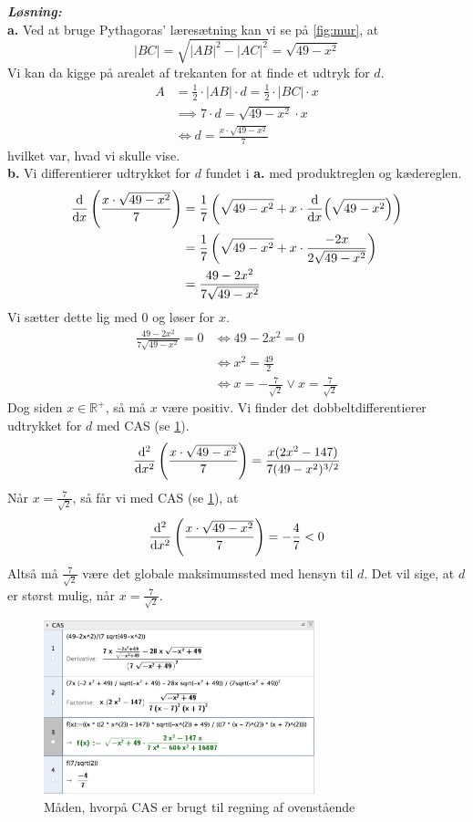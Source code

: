 \documentclass{article}
\newcommand{\sol}{\setlength{\parindent}{0cm}\textbf{\textit{Løsning:}}\setlength{\parindent}{1cm}}
\begin{document}
\sol \\ 
\textbf{a.} Ved at bruge Pythagoras' læresætning kan vi se på \cref{fig:mur}, at
\[
\left|BC\right|=\sqrt{\left|AB\right|^2-\left|AC\right|^2} = \sqrt{49-x^2} 
\] 
Vi kan da kigge på arealet af trekanten for at finde et udtryk for $d$.
\begin{equation*}
\begin{split}
  A&=\frac{1}{2}\cdot \left|AB\right| \cdot d = \frac{1}{2} \cdot \left|BC\right| \cdot x\\
  &\implies 7 \cdot d = \sqrt{49-x^2} \cdot x\\ 
  &\iff d=\frac{x\cdot \sqrt{49-x^2} }{7}
\end{split}
\end{equation*}
hvilket var, hvad vi skulle vise. \\[1ex]
\textbf{b.} Vi differentierer udtrykket for $d$ fundet i \textbf{a.} med produktreglen og kædereglen.
\begin{equation*}
\begin{split}
  \dv{x} \left(\frac{x\cdot \sqrt{49-x^2} }{7}\right)&=\frac{1}{7} \left(\sqrt{49-x^2} + x\cdot \dv{x} (\sqrt{49-x^2} )\right) \\ 
  &= \frac{1}{7} \left(\sqrt{49-x^2} + x\cdot \frac{-2x}{2 \sqrt{49-x^2} } \right)\\ 
  &= \frac{49-2x^2}{7 \sqrt{49-x^2} }
\end{split}
\end{equation*}
Vi sætter dette lig med 0 og løser for $x$.
\begin{equation*}
\begin{split}
  \frac{49-2x^2}{7 \sqrt{49-x^2} }= 0 &\iff 49 - 2x^2=0 \\ 
  &\iff x^2=\frac{49}{2}\\ 
  &\iff x=-\frac{7}{\sqrt{2} } \lor x=\frac{7}{\sqrt{2} }
\end{split}
\end{equation*}
Dog siden $x \in \mathbb{R}^+$, så må $x$ være positiv. 
Vi finder det dobbeltdifferentierer udtrykket for $d$ med CAS (se \cref{fig:CAS}). 
\[
\dv[2]{x}\left(\frac{x\cdot \sqrt{49-x^2} }{7}\right)=\frac{x(2x^2-147)}{7(49-x^2)^{3/2}}
\] 
Når $x=\frac{7}{\sqrt{2} }$, så får vi med CAS (se \cref{fig:CAS}), at
\[
\dv[2]{x}\left(\frac{x\cdot \sqrt{49-x^2} }{7}\right)=-\frac{4}{7}<0
\] 
Altså må $\frac{7}{\sqrt{2} }$ være det globale maksimumssted med hensyn til $d$. 
Det vil sige, at $d$ er størst mulig, når $x=\frac{7}{\sqrt{2} }$. 
\begin{figure}[H]
\begin{center}
  \includegraphics[width=0.7\textwidth]{CAS.png}
\end{center}
\caption{Måden, hvorpå CAS er brugt til regning af ovenstående}
\label{fig:CAS}
\end{figure}
\end{document}
